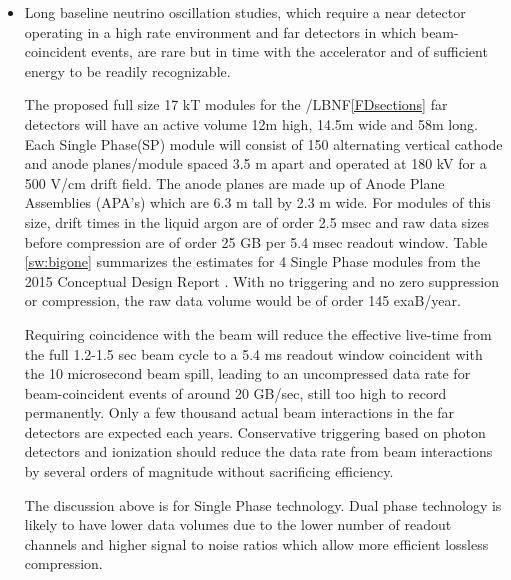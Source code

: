 \begin{itemize}
\item Long baseline neutrino oscillation studies, which require a near detector operating in a high rate environment and far detectors in which beam-coincident events,  are rare but in time with the accelerator and of sufficient energy to be readily recognizable.  

The proposed  full size 17 kT modules for the  /LBNF\ref{FDsections} far detectors will  have an active volume 12m high, 14.5m wide and 58m long.  Each Single Phase(SP) module will consist of
150 alternating vertical cathode and anode planes/module  spaced 3.5 m apart and operated at 180 kV for a 500 V/cm drift field.  The anode planes are made up of Anode Plane Assemblies  (APA's) which are 6.3 m tall by 2.3 m wide. %
For modules of this size, drift times in the liquid argon are of order 2.5 msec and raw data sizes before compression are of order 25 GB per 5.4 msec readout window. Table \ref{sw:bigone} summarizes the estimates for 4 Single Phase modules from the 2015 Conceptual Design Report \cite{cdr-annex-rates}.  With no triggering and no zero suppression or compression, the raw data volume would be of order 145 exaB/year. 

Requiring  coincidence with the  beam will reduce the effective live-time from the full 1.2-1.5 sec beam cycle to a 5.4 ms readout window coincident with the 10 microsecond beam spill, leading to an uncompressed data rate for beam-coincident events of around 20 GB/sec, still too high to record permanently.
Only a few thousand actual beam interactions in the far detectors are expected each years.  Conservative triggering based on photon detectors and ionization should reduce the data rate from beam interactions by several orders of magnitude without sacrificing efficiency.

The discussion above is for Single Phase technology. Dual phase technology is likely to have lower data volumes due to the lower number of readout channels and higher signal to noise ratios which allow more efficient  lossless compression.





\end{itemize}
